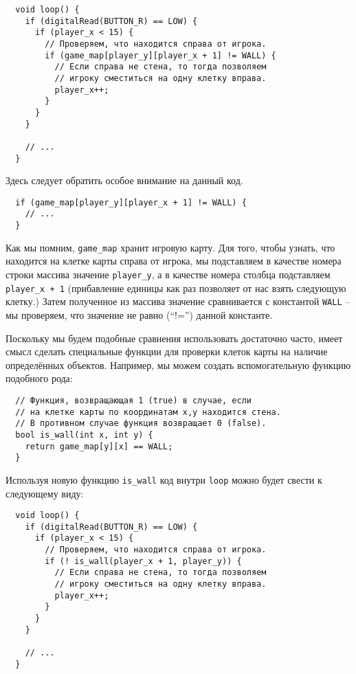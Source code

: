 \documentclass[../sparc.tex]{subfiles}
\begin{document}
\begin{verbatim}
  void loop() {
    if (digitalRead(BUTTON_R) == LOW) {
      if (player_x < 15) {
        // Проверяем, что находится справа от игрока.
        if (game_map[player_y][player_x + 1] != WALL) {
          // Если справа не стена, то тогда позволяем
          // игроку сместиться на одну клетку вправа.
          player_x++;
        }
      }
    }

    // ...
  }
\end{verbatim}

Здесь следует обратить особое внимание на данный код.

\begin{verbatim}
  if (game_map[player_y][player_x + 1] != WALL) {
    // ...
  }
\end{verbatim}

Как мы помним, \texttt{game\_map} хранит игровую карту.  Для того, чтобы узнать,
что находится на клетке карты справа от игрока, мы подставляем в качестве номера
строки массива значение \texttt{player\_y}, а в качестве номера столбца
подставляем \texttt{player\_x + 1} (прибавление единицы как раз позволяет от нас
взять следующую клетку.)  Затем полученное из массива значение сравнивается с
константой \texttt{WALL} -- мы проверяем, что значение не равно (``!='') данной
константе.

Поскольку мы будем подобные сравнения использовать достаточно часто, имеет смысл
сделать специальные функции для проверки клеток карты на наличие определённых
объектов.  Например, мы можем создать вспомогательную функцию подобного рода:

\begin{verbatim}
  // Функция, возвращающая 1 (true) в случае, если
  // на клетке карты по координатам x,y находится стена.
  // В противном случае функция возвращает 0 (false).
  bool is_wall(int x, int y) {
    return game_map[y][x] == WALL;
  }
\end{verbatim}


Используя новую функцию \texttt{is\_wall} код внутри \texttt{loop} можно будет
свести к следующему виду:

\begin{verbatim}
  void loop() {
    if (digitalRead(BUTTON_R) == LOW) {
      if (player_x < 15) {
        // Проверяем, что находится справа от игрока.
        if (! is_wall(player_x + 1, player_y)) {
          // Если справа не стена, то тогда позволяем
          // игроку сместиться на одну клетку вправа.
          player_x++;
        }
      }
    }

    // ...
  }
\end{verbatim}
\end{document}
